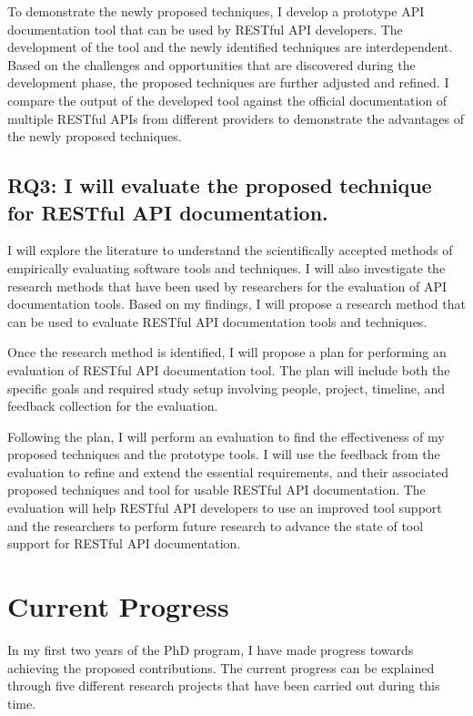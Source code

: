 \documentclass[11pt,oneside]{book}
\begin{document}
To demonstrate the newly proposed techniques, I develop a prototype API documentation tool that can be used by RESTful API developers. The development of the tool and the newly identified techniques are interdependent. Based on the challenges and opportunities that are discovered during the development phase, the proposed techniques are further adjusted and refined. I compare the output of the developed tool against the official documentation of multiple RESTful APIs from different providers to demonstrate the advantages of the newly proposed techniques.

\section{RQ3: I will evaluate the proposed technique for RESTful API documentation.}

I will explore the literature to understand the scientifically accepted methods of empirically evaluating software tools and techniques. I will also investigate the research methods that have been used by researchers for the evaluation of API documentation tools. Based on my findings, I will propose a research method that can be used to evaluate RESTful API documentation tools and techniques.

Once the research method is identified, I will propose a plan for performing an evaluation of RESTful API documentation tool. The plan will include both the specific goals and required study setup involving people, project, timeline, and feedback collection for the evaluation.

Following the plan, I will perform an evaluation to find the effectiveness of my proposed techniques and the prototype tools. I will use the feedback from the evaluation to refine and extend the essential requirements, and their associated proposed techniques and tool for usable RESTful API documentation. The evaluation will help RESTful API developers to use an improved tool support and the researchers to perform future research to advance the state of tool support for RESTful API documentation.

\chapter{Current Progress}

In my first two years of the PhD program, I have made progress towards achieving the proposed contributions. The current progress can be explained through five different research projects that have been carried out during this time.
\end{document}
